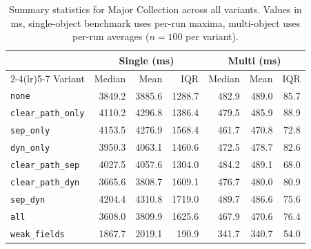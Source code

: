 \begin{table}[t]
\centering
\small
\caption{Summary statistics for Major Collection across all variants. Values in ms, single-object benchmark uses per-run maxima, multi-object uses per-run averages ($n=100$ per variant).}
\label{tab:stats-major}
\begin{tabular}{l rrr rrr}
\toprule
 & \multicolumn{3}{c}{Single (ms)} & \multicolumn{3}{c}{Multi (ms)} \\
\cmidrule(lr){2-4}\cmidrule(lr){5-7}
Variant & Median & Mean & IQR & Median & Mean & IQR \\
\midrule
\texttt{none} & 3849.2 & 3885.6 & 1288.7 & 482.9 & 489.0 & 85.7 \\
\texttt{clear\_path\_only} & 4110.2 & 4296.8 & 1386.4 & 479.5 & 485.9 & 88.9 \\
\texttt{sep\_only} & 4153.5 & 4276.9 & 1568.4 & 461.7 & 470.8 & 72.8 \\
\texttt{dyn\_only} & 3950.3 & 4063.1 & 1460.6 & 472.5 & 478.7 & 82.6 \\
\texttt{clear\_path\_sep} & 4027.5 & 4057.6 & 1304.0 & 484.2 & 489.1 & 68.0 \\
\texttt{clear\_path\_dyn} & 3665.6 & 3808.7 & 1609.1 & 476.7 & 480.0 & 80.9 \\
\texttt{sep\_dyn} & 4204.4 & 4310.8 & 1719.0 & 489.7 & 486.6 & 75.6 \\
\texttt{all} & 3608.0 & 3809.9 & 1625.6 & 467.9 & 470.6 & 76.4 \\
\texttt{weak\_fields} & 1867.7 & 2019.1 & 190.9 & 341.7 & 340.7 & 54.0 \\
\bottomrule
\end{tabular}
\end{table}

